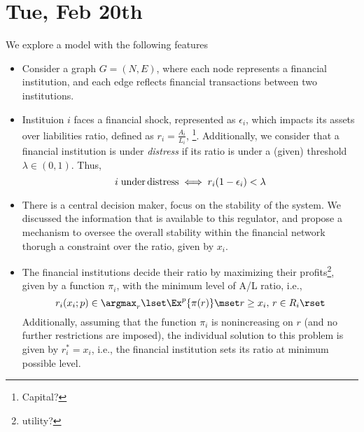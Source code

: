 \section{Tue, Feb 20th}
We explore a model with the following features
\begin{itemize}
\item[1.] Consider a graph $G=(N,E)$, where each node represents a financial institution, and each edge reflects financial transactions between two institutions. 

\item[2.] Instituion $i$ faces a financial shock, represented as $\epsilon_i$, which impacts its assets over liabilities ratio, defined as $r_i=\frac{A_i}{L_i}$, \footnote{Capital?}.  Additionally, we consider that a financial institution is under \emph{distress} if its ratio is under a (given) threshold $\lambda\in(0,1)$.  Thus,
\[i\;{\rm under\,distress}\iff r_i(1-\epsilon_i)<\lambda\]

\item[3.] There is a central decision maker, focus on the stability of the system.  We discussed the information that is available to this regulator, and propose a mechanism to oversee the overall stability within the financial network thorugh a constraint over the ratio, given by $x_i$.

\item[4.]  The financial institutions decide their ratio by maximizing their profits\footnote{utility?}, given by a function $\pi_i$, with the minimum level of A/L ratio, i.e.,
\[r_i(x_i;p)\in\argmax_r\lset \Ex^p\{ \pi(r)\}\mset r\geq x_i,\,r\in R_i\rset\]
Additionally, assuming that the function $\pi_i$ is nonincreasing on $r$ (and no further restrictions are imposed), the individual solution to this problem is given by $r_i^*=x_i$, i.e., the financial institution sets its ratio at minimum possible level.


\end{itemize}
